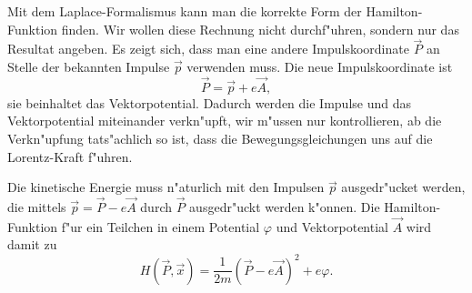 Mit dem Laplace-Formalismus kann man die korrekte Form der
Hamilton-Funktion finden.
Wir wollen diese Rechnung nicht durchf"uhren, sondern nur das Resultat
angeben.
Es zeigt sich, dass man eine andere Impulskoordinate $\vec P$
an Stelle der bekannten Impulse $\vec p$ verwenden muss. 
Die neue Impulskoordinate ist 
\[
\vec P = \vec p + e\vec A,
\]
sie beinhaltet das Vektorpotential.
Dadurch werden die Impulse und das Vektorpotential miteinander 
verkn"upft, wir m"ussen nur kontrollieren, ab die Verkn"upfung
tats"achlich so ist, dass die Bewegungsgleichungen uns auf die
Lorentz-Kraft f"uhren.

Die kinetische Energie muss n"aturlich mit den Impulsen $\vec p$ ausgedr"ucket
werden, die mittels $\vec p=\vec P-e\vec A$ durch $\vec P$
ausgedr"uckt werden k"onnen.
Die Hamilton-Funktion f"ur ein Teilchen in einem Potential $\varphi$
und Vektorpotential $\vec A$ wird damit zu
\begin{equation}
H(\vec P, \vec x)=\frac1{2m}(\vec P-e\vec A)^2+e\varphi.
\label{skript:hamiltonmitmagnetfeld}
\end{equation}

